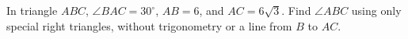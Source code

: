 In triangle $ABC$, $\angle BAC=30^\circ$, $AB=6$, and $AC=6\sqrt3$. Find $\angle ABC$ using only special right triangles, without trigonometry or a line from $B$ to $AC$.
